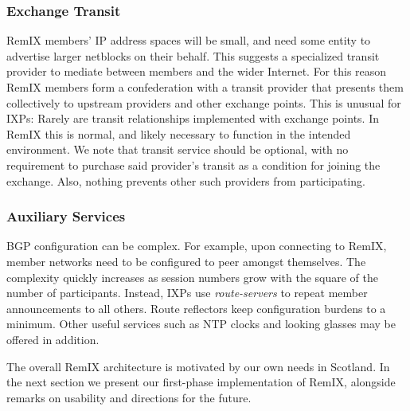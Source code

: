 \subsubsection{Exchange Transit}

RemIX members' IP address spaces will be small, and need some entity
to advertise larger netblocks on their behalf. This suggests a
specialized transit provider to mediate between members and the wider
Internet. For this reason RemIX members form a confederation with a
transit provider that presents them collectively to upstream providers
and other exchange points. This is unusual for \acp{IXP}: Rarely are
transit relationships implemented with exchange points. In RemIX this
is normal, and likely necessary to function in the intended
environment. We note that transit service should be optional,
with no requirement to purchase said provider's transit as a
condition for joining the exchange. Also, nothing prevents other such
providers from participating.

\subsubsection{Auxiliary Services}

\acs{BGP} configuration can be complex. For example, upon connecting
to RemIX, member networks need to be configured to peer amongst
themselves. The complexity quickly increases as session numbers grow
with the square of the number of participants. Instead, \acp{IXP} use
\emph{route-servers} to repeat
member announcements to all others. Route reflectors keep
configuration burdens to a minimum.
Other useful services such as \acs{NTP} clocks and looking glasses
may be offered in addition.


The overall RemIX architecture is motivated by our own needs in
Scotland. In the next section we present our first-phase
implementation of RemIX, alongside remarks on usability and directions
for the future.

